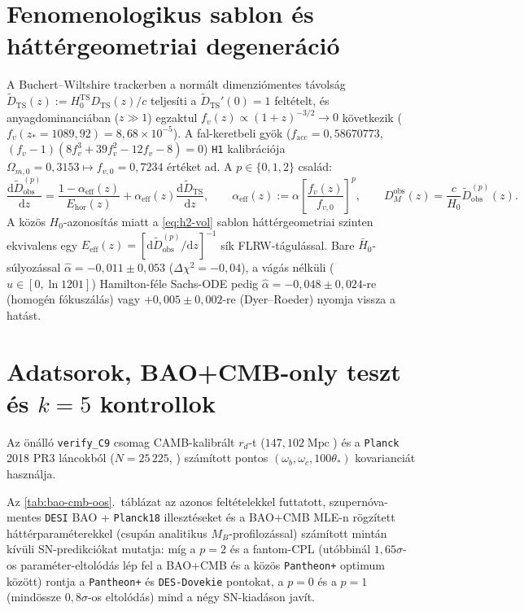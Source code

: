 \documentclass[11pt,a4paper]{article}
\begin{document}
\section{Fenomenologikus sablon \'es h\'att\'ergeometriai degener\'aci\'o}
A Buchert--Wiltshire trackerben \cite{Wiltshire2009PRD,LaneWiltshire2025MNRAS} a norm\'alt dimenzi\'omentes t\'avols\'ag $\widetilde{D}_{\mathrm{TS}}(z) := H_0^{\mathrm{TS}}D_{\mathrm{TS}}(z)/c$ teljes\'iti a $\widetilde{D}_{\mathrm{TS}}'(0) = 1$ felt\'etelt, \'es anyagdominanci\'aban ($z \gg 1$) egzaktul $f_v(z) \propto (1+z)^{-3/2} \to 0$ k\"ovetkezik ($f_v(z_* = 1089{,}92) = 8{,}68\times 10^{-5}$). A fal-keretbeli gy\"ok ($f_{\mathrm{acc}} = 0{,}58670773$, $(f_v - 1)(8f_v^3 + 39f_v^2 - 12f_v - 8) = 0$) \texttt{H1} kalibr\'aci\'oja $\Omega_{m,0} = 0{,}3153 \mapsto f_{v,0} = 0{,}7234$ \'ert\'eket ad. A $p \in \{0, 1, 2\}$ csal\'ad:
\begin{equation}
    \frac{\mathrm{d}\widetilde{D}_{\mathrm{obs}}^{(p)}}{\mathrm{d}z} = \frac{1 - \alpha_{\mathrm{eff}}(z)}{E_{\mathrm{hor}}(z)} + \alpha_{\mathrm{eff}}(z)\frac{\mathrm{d}\widetilde{D}_{\mathrm{TS}}}{\mathrm{d}z}, \qquad \alpha_{\mathrm{eff}}(z) := \alpha\left[\frac{f_v(z)}{f_{v,0}}\right]^p, \qquad D_M^{\mathrm{obs}}(z) = \frac{c}{H_0}\widetilde{D}_{\mathrm{obs}}^{(p)}(z).
    \label{eq:h2-vol}
\end{equation}
A k\"oz\"os $H_0$-azonos\'it\'as miatt a \eqref{eq:h2-vol} sablon h\'att\'ergeometriai szinten ekvivalens egy $E_{\mathrm{eff}}(z) = [\mathrm{d}\widetilde{D}_{\mathrm{obs}}^{(p)}/\mathrm{d}z]^{-1}$ s\'ik FLRW-t\'agul\'assal. Bare $\bar{H}_0$-s\'ulyoz\'assal $\hat{\alpha} = -0{,}011 \pm 0{,}053$ ($\Delta\chi^2 = -0{,}04$), a v\'ag\'as n\'elk\"uli ($u \in [0, \ln 1201]$) Hamilton-f\'ele Sachs-ODE pedig $\hat{\alpha} = -0{,}048 \pm 0{,}024$-re (homog\'en f\'okusz\'al\'as) vagy $+0{,}005 \pm 0{,}002$-re (Dyer--Roeder) nyomja vissza a hat\'ast.

\section{Adatsorok, BAO+CMB-only teszt \'es $k = 5$ kontrollok}
{\sloppy Az \"on\'all\'o \texttt{verify\_C9} csomag CAMB-kalibr\'alt $r_d$-t ($147{,}102\;\mathrm{Mpc}$ \cite{Aubourg2015BAO}) \'es a \texttt{Planck} 2018 PR3  l\'ancokb\'ol ($N = 25\,225$, ) sz\'am\'itott pontos $(\omega_b, \omega_c, 100\theta_*)$ kovarianci\'at haszn\'alja.\par} Az \ref{tab:bao-cmb-oos}.\ t\'abl\'azat az azonos felt\'etelekkel futtatott, szupern\'ova-mentes \texttt{DESI} BAO + \texttt{Planck18} illeszt\'eseket \'es a BAO+CMB MLE-n r\"ogz\'itett h\'att\'erparam\'eterekkel (csup\'an analitikus $M_B$-profiloz\'assal) sz\'am\'itott mint\'an k\'iv\"uli SN-predikci\'okat mutatja: m\'ig a $p = 2$ \'es a fantom-CPL (ut\'obbin\'al $1{,}65\sigma$-os param\'eter-eltol\'od\'as l\'ep fel a BAO+CMB \'es a k\"oz\"os \texttt{Pantheon+} optimum k\"oz\"ott) rontja a \texttt{Pantheon+} \'es \texttt{DES-Dovekie} pontokat, a $p = 0$ \'es a $p = 1$ (mind\"ossze $0{,}8\sigma$-os eltol\'od\'as) mind a n\'egy SN-kiad\'ason jav\'it.
\end{document}
